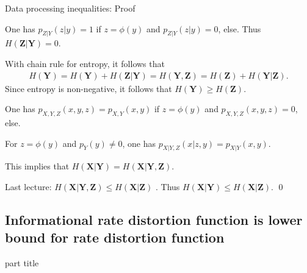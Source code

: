 \begin{frame}{Data processing inequalities: Proof}
\bit 
\item One has $p_{Z|Y}(z|y)=1$ if $z=\phi(y)$ and $p_{Z|Y}(z|y)=0$, else. Thus 
$H(\mathbf{Z}|\mathbf{Y})=0$.
\item With chain rule for entropy, it follows that
\begin{align*}
H(\mathbf{Y})=H(\mathbf{Y})+H(\mathbf{Z}|\mathbf{Y})=H(\mathbf{Y},\mathbf{Z})=H(\mathbf{Z})+H(\mathbf{Y}|\mathbf{Z}).
\end{align*}
Since entropy is non-negative, it follows that $H(\mathbf{Y})\geq H(\mathbf{Z})$.
\item 
One has $p_{X,Y,Z}(x,y,z)=p_{X,Y}(x,y)$ if $z=\phi(y)$ and $p_{X,Y,Z}(x,y,z)=0$, else. 
\item For $z=\phi(y)$ and 
$p_Y(y)\neq 0$, one has $p_{X|Y,Z}(x|z,y)=p_{X|Y}(x,y)$. 
\item[\iarrow] This implies that $H(\mathbf{X}|\mathbf{Y})=H(\mathbf{X}|\mathbf{Y},\mathbf{Z})$.
\item Last lecture: $H(\mathbf{X}|\mathbf{Y},\mathbf{Z})\leq H(\mathbf{X}|\mathbf{Z})$ .
Thus $H(\mathbf{X}|\mathbf{Y})\leq H(\mathbf{X}|\mathbf{Z})$. \qed
\eit 
\end{frame}





















\subsection{Informational rate distortion function is lower bound for rate distortion function}
\begin{frame}
 \vspace{8.0ex}
\begin{center}
\begin{beamercolorbox}[sep=12pt,center]{part title}
\insertsubsection\par
\end{beamercolorbox}
\end{center}
\end{frame}
